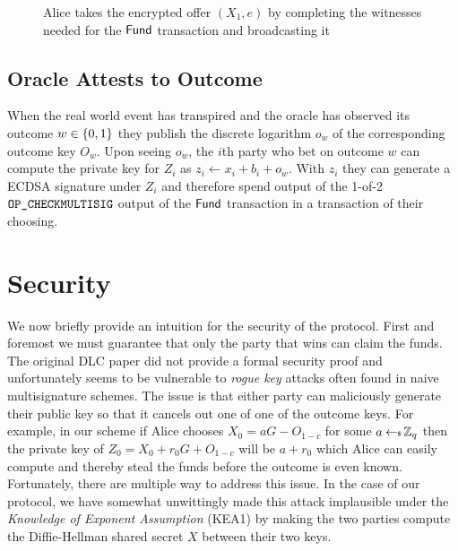 \documentclass[runningheads]{llncs}
\begin{document}
\begin{figure}[!h]
  \centering
    \label{fig:takeoffer}
    \caption{Alice takes the encrypted offer $(X_1, e)$ by completing the witnesses needed for the $\textsf{Fund}$ transaction and broadcasting it}
  \end{figure}

\subsection{Oracle Attests to Outcome}

When the real world event has transpired and the oracle has observed its outcome $w \in \{0,1\}$ they publish the discrete logarithm $o_w$ of the corresponding outcome key $O_w$. Upon seeing $o_w$, the $i$th party who bet on outcome $w$ can compute the private key for $Z_i$ as $z_i \gets x_i + b_i + o_w$. With $z_i$ they can generate a ECDSA signature under $Z_i$ and therefore spend output of the 1-of-2 $\texttt{OP\_CHECKMULTISIG}$ output of the $\textsf{Fund}$ transaction in a transaction of their choosing.

\section{Security}

We now briefly provide an intuition for the security of the protocol. First and foremost we must guarantee that only the party that wins can claim the funds. The original DLC paper\cite{DLC} did not provide a formal security proof and unfortunately seems to be vulnerable to \emph{rogue key} attacks often found in naive multisignature schemes\cite{musig}. The issue is that either party can maliciously generate their public key so that it cancels out one of one of the outcome keys. For example, in our scheme if Alice chooses $X_0 = aG - O_{1-c}$ for some $a \hskip2.3pt{\gets\!\!\mbox{\tiny${\$}$\normalsize}}\, \mathbb{Z}_q$ then the private key of $Z_0 = X_0 + r_0G + O_{1-c}$ will be $a + r_0$ which Alice can easily compute and thereby steal the funds before the outcome is even known. Fortunately, there are multiple way to address this issue. In the case of our protocol, we have somewhat unwittingly made this attack implausible under the \emph{Knowledge of Exponent Assumption} (KEA1) \cite{KEA} by making the two parties compute the Diffie-Hellman shared secret $X$ between their two keys.
\end{document}
